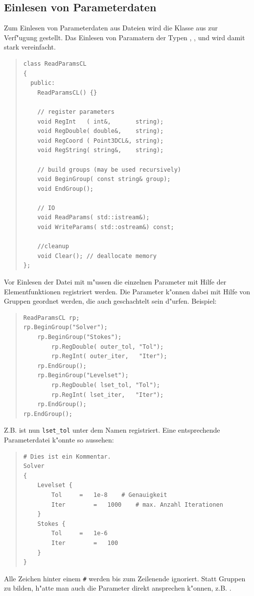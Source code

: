 \documentclass[11pt,a4paper]{article}
\newenvironment{Code}{\begin{quote}\scriptsize}{\end{quote}}
\begin{document}
\subsection{Einlesen von Parameterdaten}

Zum Einlesen von Parameterdaten aus Dateien wird die Klasse 
aus 
zur Verf"ugung gestellt. Das Einlesen von Paramatern der Typen , 
,  und  wird damit stark vereinfacht.
\begin{Code}
\begin{verbatim}
class ReadParamsCL
{
  public:
    ReadParamsCL() {}
    
    // register parameters
    void RegInt   ( int&,       string);
    void RegDouble( double&,    string);
    void RegCoord ( Point3DCL&, string);
    void RegString( string&,    string);
    
    // build groups (may be used recursively)
    void BeginGroup( const string& group);
    void EndGroup();
    
    // IO
    void ReadParams( std::istream&);
    void WriteParams( std::ostream&) const;
    
    //cleanup
    void Clear(); // deallocate memory
};
\end{verbatim}
\end{Code}
Vor Einlesen der Datei mit  m"ussen die einzelnen Parameter
mit Hilfe der Elementfunktionen  registriert werden. Die Parameter
k"onnen dabei mit Hilfe von Gruppen geordnet werden, die auch geschachtelt sein
d"urfen. Beispiel:
\begin{Code}
\begin{verbatim}
ReadParamsCL rp;
rp.BeginGroup("Solver");
    rp.BeginGroup("Stokes");
        rp.RegDouble( outer_tol, "Tol");
        rp.RegInt( outer_iter,   "Iter");
    rp.EndGroup();
    rp.BeginGroup("Levelset");
        rp.RegDouble( lset_tol, "Tol");
        rp.RegInt( lset_iter,   "Iter");
    rp.EndGroup();
rp.EndGroup();
\end{verbatim}
\end{Code}
Z.B. ist nun \verb|lset_tol| unter dem Namen  
registriert. Eine entsprechende Parameterdatei k"onnte so aussehen:
\begin{Code}
\begin{verbatim}
# Dies ist ein Kommentar.
Solver
{
    Levelset {
        Tol		=	1e-8	# Genauigkeit
        Iter		=	1000	# max. Anzahl Iterationen
    }
    Stokes {
        Tol		=	1e-6
        Iter		=	100
    }
}
\end{verbatim}
\end{Code}
Alle Zeichen hinter einem \verb|#| werden bis zum Zeilenende ignoriert.
Statt Gruppen zu bilden, h"atte man auch die Parameter direkt ansprechen k"onnen,
z.B. .
\end{document}
